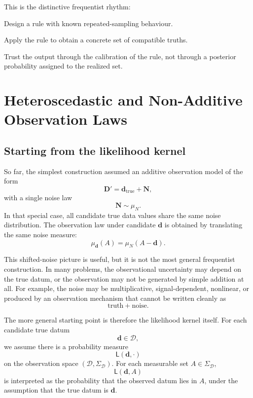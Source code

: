 \documentclass[11pt]{article}
\newcommand{\Dspace}{\mathcal D}
\newcommand{\SigmaD}{\Sigma_{\mathcal D}}
\newcommand{\muN}{\mu_N}
\newcommand{\Dobsrand}{\mathbf D'}
\newcommand{\Nrand}{\mathbf N}
\newcommand{\dtrue}{\mathbf d_{\mathrm{true}}}
\begin{document}
This is the distinctive frequentist rhythm:
\begin{description}[leftmargin=3.2cm,style=nextline]
    \item[Before seeing data.]
    Design a rule with known repeated-sampling behaviour.

    \item[After seeing data.]
    Apply the rule to obtain a concrete set of compatible truths.

    \item[Interpretation.]
    Trust the output through the calibration of the rule, not through a posterior probability assigned to the realized set.
\end{description}


\section{Heteroscedastic and Non-Additive Observation Laws}

\subsection{Starting from the likelihood kernel}

So far, the simplest construction assumed an additive observation model of the form
\[
    \Dobsrand=\dtrue+\Nrand,
\]
with a single noise law
\[
    \Nrand\sim\muN.
\]
In that special case, all candidate true data values share the same noise distribution. The observation law under candidate \(\mathbf d\) is obtained by translating the same noise measure:
\[
    \mu_{\mathbf d}(A)
    =
    \muN(A-\mathbf d).
\]

This shifted-noise picture is useful, but it is not the most general frequentist construction. In many problems, the observational uncertainty may depend on the true datum, or the observation may not be generated by simple addition at all. For example, the noise may be multiplicative, signal-dependent, nonlinear, or produced by an observation mechanism that cannot be written cleanly as
\[
    \text{truth}+\text{noise}.
\]

The more general starting point is therefore the likelihood kernel itself. For each candidate true datum
\[
    \mathbf d\in\Dspace,
\]
we assume there is a probability measure
\[
    \mathsf L(\mathbf d,\cdot)
\]
on the observation space \((\Dspace,\SigmaD)\). For each measurable set \(A\in\SigmaD\),
\[
    \mathsf L(\mathbf d,A)
\]
is interpreted as the probability that the observed datum lies in \(A\), under the assumption that the true datum is \(\mathbf d\).
\end{document}
